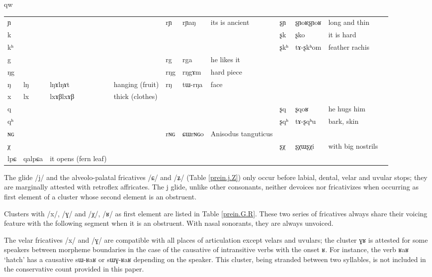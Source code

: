 qw\documentclass[oldfontcommands,oneside,a4paper,11pt]{article}
\newcommand{\ipa}[1]{{\phon #1}} %
\newcommand{\idph}[1]{\cellcolor{gray}\textbf{#1}}
\begin{document}
\begin{table}
{\begin{tabular}{l|lll|lll|lll|l}
\ipa{ɲ}  & 	  & 	  & 	  & 	 \ipa{rɲ}  & 	 \ipa{rɲaŋ}  & 	 its is ancient & 	 \ipa{ʂɲ} \idph{}  & 	\ipa{ʂɲoʁʂɲoʁ} & 	long and thin & 	\\
\ipa{k}  & 	  & 	  & 	  & 	 & 	 & 	 & 	 \ipa{ʂk}  & 	 \ipa{ʂko}  & 	 it is hard & 	\\
\ipa{kʰ}  & 	  & 	  & 	  & 	 & 	 & 	 & 	 \ipa{ʂkʰ}  & 	 \ipa{tɤ-ʂkʰom}  & 	 feather rachis & 	\\
\ipa{g}  & 	  & 	  & 	  & 	 \ipa{rg}  & 	 \ipa{rga}  & 	 he likes it & 	 & 	 & 	 & 	\\
\ipa{ŋg}  & 	  & 	  & 	  & 	 \ipa{rŋg}  & 	 \ipa{rŋgɤm}  & 	hard piece  & 	 & 	 & 	 & 	\\
\ipa{ŋ}  & 	 \ipa{lŋ} \idph{}  & 	 \ipa{lŋɤlŋɤt}  & 	hanging (fruit)  & 	 \ipa{rŋ}  & 	 \ipa{tɯ-rŋa}  & 	 face & 	 & 	 & 	 & 	\\
\ipa{x}  & 	 \ipa{lx} \idph{}  & 	 \ipa{lxɤβlxɤβ}  & 	thick (clothes)  & 	  & 	  & 	  & 	 & 	 & 	 & 	\\
\ipa{q}  & 	  & 	  & 	  & 	 & 	 & 	 & 	 \ipa{ʂq}  & 	 \ipa{ʂqoʁ}  & 	he hugs him  & 	\\
\ipa{qʰ}  & 	  & 	  & 	  & 	 & 	 & 	 & 	 \ipa{ʂqʰ}  & 	 \ipa{tɤ-ʂqʰu}  & 	bark, skin & 	\\
\ipa{ɴɢ}  & 	  & 	  & 	  & 	 \ipa{rɴɢ}  & 	 \ipa{ɕɯrɴɢo}  & 	Anisodus tanguticus  & 	 & 	 & 	 & 	\\
\ipa{χ}  & 	  & 	  & 	  & 	 & 	 & 	 & 	 \ipa{ʂχ}  & 	 \ipa{ʂχɯʂχi}  & 	with big nostrils  & 	\\
\midrule
\ipa{lpɕ}	&\ipa{qalpɕa} & it opens (fern leaf) \\
\bottomrule
\end{tabular}}
\end{table}
 
  The glide /j/  and the alveolo-palatal fricatives /ɕ/ and /ʑ/ (Table \ref{prein.j.Z}) only occur before labial, dental, velar and uvular stops; they are marginally attested with retroflex affricates. The \ipa{j} glide, unlike other consonants, neither devoices nor fricativizes when occurring as first element of a cluster whose second element is an obstruent.


  Clusters with   /x/, /ɣ/ and /χ/, /ʁ/ as first element are listed in Table \ref{prein.G.R}. These two series of fricatives  always share their voicing feature with the following segment when it is an obstruent. With nasal sonorants, they are always unvoiced.
  
 
  The velar fricatives /x/ and /ɣ/ are compatible with all places of articulation except velars and uvulars; the cluster \ipa{ɣʁ} is attested for some speakers between morpheme boundaries in the case of the causative of intransitive verbs with the onset \ipa{ʁ}. For instance, the verb \ipa{ʁaʁ} `hatch' has a causative \ipa{sɯ-ʁaʁ} or \ipa{sɯɣ-ʁaʁ} depending on the speaker. This cluster, being  stranded between two syllables, is not included in the conservative count provided in this paper.
  
\end{document}
